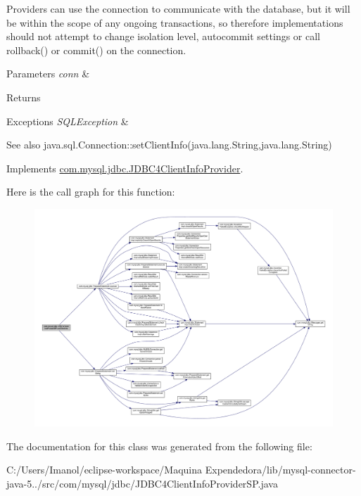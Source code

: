 Providers can use the connection to communicate with the database, but it will be within the scope of any ongoing transactions, so therefore implementations should not attempt to change isolation level, autocommit settings or call rollback() or commit() on the connection.


\begin{DoxyParams}{Parameters}
{\em conn} & \\
\hline
\end{DoxyParams}
\begin{DoxyReturn}{Returns}

\end{DoxyReturn}

\begin{DoxyExceptions}{Exceptions}
{\em S\+Q\+L\+Exception} & \\
\hline
\end{DoxyExceptions}
\begin{DoxySeeAlso}{See also}
java.\+sql.\+Connection\+::set\+Client\+Info(java.\+lang.\+String,java.\+lang.\+String) 
\end{DoxySeeAlso}


Implements \mbox{\hyperlink{interfacecom_1_1mysql_1_1jdbc_1_1_j_d_b_c4_client_info_provider_ac4916282e520bf06380444e4703ae389}{com.\+mysql.\+jdbc.\+J\+D\+B\+C4\+Client\+Info\+Provider}}.

Here is the call graph for this function\+:
\nopagebreak
\begin{figure}[H]
\begin{center}
\leavevmode
\includegraphics[width=350pt]{classcom_1_1mysql_1_1jdbc_1_1_j_d_b_c4_client_info_provider_s_p_afc850b09b440756a3a5ecc69b8745ce4_cgraph}
\end{center}
\end{figure}


The documentation for this class was generated from the following file\+:\begin{DoxyCompactItemize}
\item 
C\+:/\+Users/\+Imanol/eclipse-\/workspace/\+Maquina Expendedora/lib/mysql-\/connector-\/java-\/5../src/com/mysql/jdbc/J\+D\+B\+C4\+Client\+Info\+Provider\+S\+P.\+java\end{DoxyCompactItemize}
